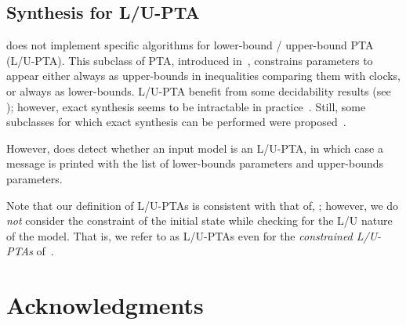 

\section{Synthesis for L/U-PTA}

\imitator{} does not implement specific algorithms for lower-bound / upper-bound PTA (L/U-PTA).
This subclass of PTA, introduced in~\cite{HRSV02}, constrains parameters to appear either always as upper-bounds in inequalities comparing them with clocks, or always as lower-bounds.
L/U-PTA benefit from some decidability results (see \eg{} \cite{HRSV02,BlT09,JLR15,AM15,ALime17}); however, exact synthesis seems to be intractable in practice~\cite{JLR15,ALR16ICFEM}.
Still, some subclasses for which exact synthesis can be performed were proposed~\cite{BlT09,ALR18FORMATS}.

However, \imitator{} does detect whether an input model is an L/U-PTA, in which case a message is printed with the list of lower-bounds parameters and upper-bounds parameters.

\begin{remark}
	Note that our definition of L/U-PTAs is consistent with that of, \eg{} \cite{BlT09}; however, we do \emph{not} consider the constraint of the initial state while checking for the L/U nature of the model.
	That is, we refer to as L/U-PTAs even for the \emph{constrained L/U-PTAs} of~\cite{BlT09}.
\end{remark}




\chapter{Acknowledgments}

